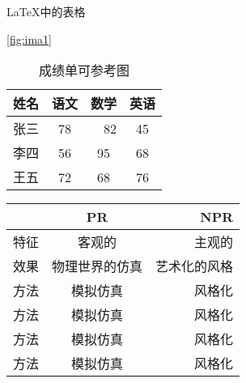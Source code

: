\LaTeX{中的表格}
\begin{table}[h]
    \centering
    \caption{成绩单可参考图}\ref{fig:ima1}
    
    \begin{tabular}{|c|c|c|c|}
    \hline
    姓名 & 语文 & 数学 & 英语  \\
    \hline
    张三 & 78　&　82 & 45 \\
    \hline
    李四 & 56 & 95 & 68 \\
    \hline
    王五 & 72 & 68 & 76 \\
    \hline

    \end{tabular}
    \label{tab:table1}
\end{table}

\begin{tabular}{|l|c|r|}
    \hline & PR & NPR \\
    \hline 特征 & 客观的 & 主观的 \\
    \hline 效果 & 物理世界的仿真 & 艺术化的风格 \\
    \hline 方法 & 模拟仿真 & 风格化 \\
    \hline 方法 & 模拟仿真 & 风格化 \\
    \hline 方法 & 模拟仿真 & 风格化 \\
    \hline 方法 & 模拟仿真 & 风格化 \\
\end{tabular}
